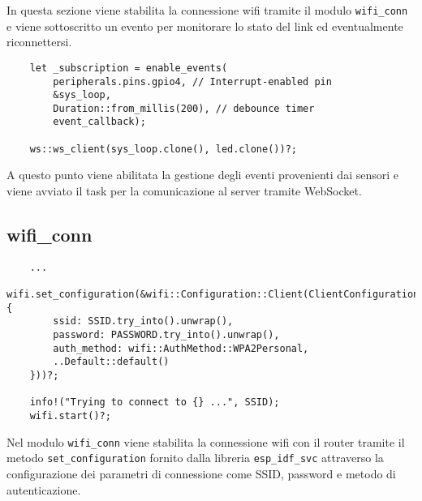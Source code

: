 In questa sezione viene stabilita la connessione wifi tramite il modulo \texttt{wifi\_conn}
e viene sottoscritto un evento per monitorare lo stato del link ed eventualmente riconnettersi.

\begin{listing}[H]
    \begin{verbatim}
    let _subscription = enable_events(
        peripherals.pins.gpio4, // Interrupt-enabled pin
        &sys_loop,
        Duration::from_millis(200), // debounce timer
        event_callback);

    ws::ws_client(sys_loop.clone(), led.clone())?;
    \end{verbatim}
\end{listing}

A questo punto viene abilitata la gestione degli eventi provenienti dai sensori
e viene avviato il task per la comunicazione al server tramite WebSocket.

\subsection{wifi\_conn}

\begin{listing}[H]
    \begin{verbatim}
    ...
    wifi.set_configuration(&wifi::Configuration::Client(ClientConfiguration {
        ssid: SSID.try_into().unwrap(),
        password: PASSWORD.try_into().unwrap(),
        auth_method: wifi::AuthMethod::WPA2Personal,
        ..Default::default()
    }))?;

    info!("Trying to connect to {} ...", SSID);
    wifi.start()?;
    \end{verbatim}
\end{listing}

Nel modulo \texttt{wifi\_conn} viene stabilita la connessione wifi con il router tramite il metodo \texttt{set\_configuration}
fornito dalla libreria \texttt{esp\_idf\_svc} attraverso la configurazione dei parametri di connessione come SSID, password e metodo di autenticazione.


